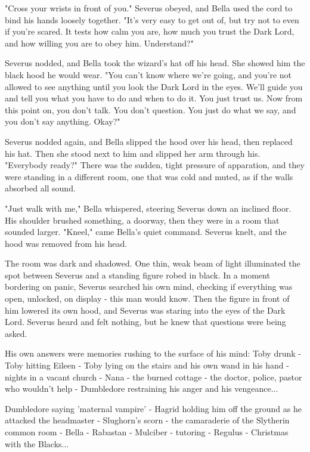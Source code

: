 \documentclass[a4paper,11pt]{article}
\begin{document}
"Cross your wrists in front of you." Severus obeyed, and Bella used the cord to bind his hands loosely together. "It's very easy to get out of, but try not to even if you're scared. It tests how calm you are, how much you trust the Dark Lord, and how willing you are to obey him. Understand?"

Severus nodded, and Bella took the wizard's hat off his head. She showed him the black hood he would wear. "You can't know where we're going, and you're not allowed to see anything until you look the Dark Lord in the eyes. We'll guide you and tell you what you have to do and when to do it. You just trust us. Now from this point on, you don't talk. You don't question. You just do what we say, and you don't say anything. Okay?"

Severus nodded again, and Bella slipped the hood over his head, then replaced his hat. Then she stood next to him and slipped her arm through his. "Everybody ready?" There was the sudden, tight pressure of apparation, and they were standing in a different room, one that was cold and muted, as if the walls absorbed all sound.

"Just walk with me," Bella whispered, steering Severus down an inclined floor. His shoulder brushed something, a doorway, then they were in a room that sounded larger. "Kneel," came Bella's quiet command. Severus knelt, and the hood was removed from his head.

The room was dark and shadowed. One thin, weak beam of light illuminated the spot between Severus and a standing figure robed in black. In a moment bordering on panic, Severus searched his own mind, checking if everything was open, unlocked, on display - this man would know. Then the figure in front of him lowered its own hood, and Severus was staring into the eyes of the Dark Lord. Severus heard and felt nothing, but he knew that questions were being asked.

His own answers were memories rushing to the surface of his mind: Toby drunk - Toby hitting Eileen - Toby lying on the stairs and his own wand in his hand - nights in a vacant church - Nana - the burned cottage - the doctor, police, pastor who wouldn't help - Dumbledore restraining his anger and his vengeance...

Dumbledore saying 'maternal vampire' - Hagrid holding him off the ground as he attacked the headmaster - Slughorn's scorn - the camaraderie of the Slytherin common room - Bella - Rabastan - Mulciber - tutoring - Regulus - Christmas with the Blacks...
\end{document}
